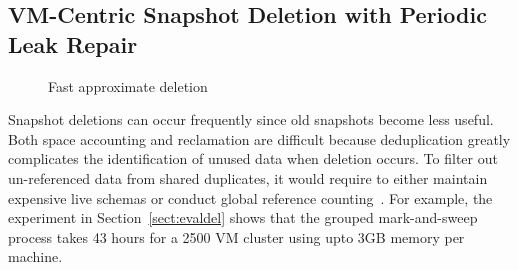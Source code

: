
\subsection{VM-Centric Snapshot Deletion with Periodic Leak Repair}
\label{sect:delete}


\begin{figure}[htbp]
  \centering
  \caption{Fast approximate deletion}
  \label{fig:deletion_flow}
\end{figure}

Snapshot deletions can occur frequently since old snapshots become less useful.
Both space accounting and reclamation are difficult because deduplication
greatly complicates the  identification of unused data when deletion occurs.
To filter out un-referenced data from shared duplicates,
it would require to either maintain expensive live schemas or conduct
global reference counting~\cite{Guo2011}.
For example, the experiment in Section~\ref{sect:evaldel} shows that
 the grouped mark-and-sweep process takes 43 hours for a 2500 VM cluster using upto 3GB memory per machine.

